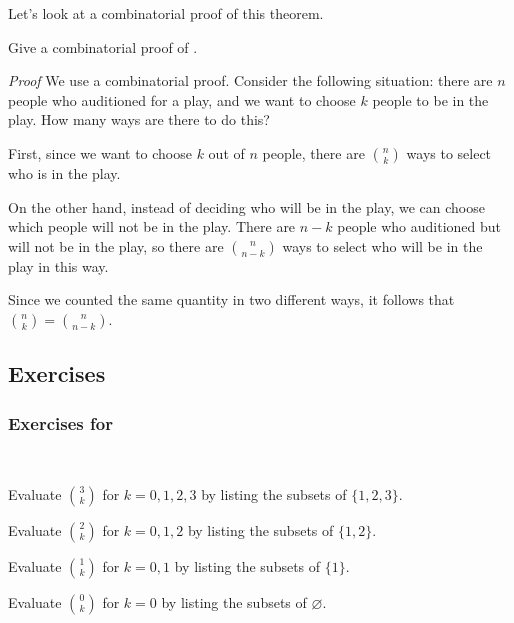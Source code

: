 Let's look at a combinatorial proof of this theorem.

\begin{exam}
\label{exam_comb_pf_sym_arith_tri}
     Give a combinatorial proof of .
            \begin{soln}
                \emph{Proof}  We use a combinatorial proof.  Consider the following situation: there are $n$ people who auditioned for a play, and we want to choose $k$ people to be in the play. How many ways are there to do this?

                First, since we want to choose $k$ out of $n$ people, there are $\binom{n}{k}$ ways to select who is in the play. 

                On the other hand, instead of deciding who will be in the play, we can choose which people will not be in the play.  There are $n-k$ people who auditioned but will not be in the play, so there are $\binom{n}{n-k}$ ways to select who will be in the play in this way.

                Since we counted the same quantity in two different ways, it follows that $\binom{n}{k} = \binom{n}{n-k}.$
            \end{soln}
\end{exam}


\subsection{Exercises}


\subsubsection*{Exercises for  \subsubsetschoose}

\begin{exer} [\exerP] %
\label{exer_eval_binomial_coeffs_list_subsets}
~
    \begin{exerpart}
        \item Evaluate $\binom{3}{k}$ for $k = 0, 1, 2, 3$ by listing the subsets of $\{1,2,3\}$.
        \item Evaluate $\binom{2}{k}$ for $k = 0, 1, 2$ by listing the subsets of $\{1,2\}$.
        \item Evaluate $\binom{1}{k}$ for $k = 0, 1$ by listing the subsets of $\{1\}$.
        \item Evaluate $\binom{0}{k}$ for $k = 0$ by listing the subsets of $\varnothing$.
    \end{exerpart}
\end{exer}

